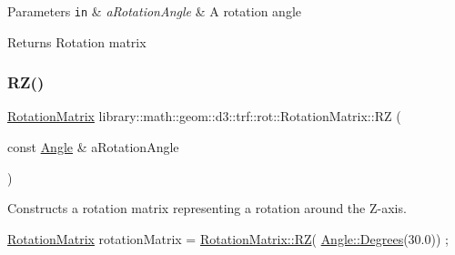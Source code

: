 \begin{DoxyParams}[1]{Parameters}
\mbox{\tt in}  & {\em a\+Rotation\+Angle} & A rotation angle \\
\hline
\end{DoxyParams}
\begin{DoxyReturn}{Returns}
Rotation matrix 
\end{DoxyReturn}
\mbox{\label{classlibrary_1_1math_1_1geom_1_1d3_1_1trf_1_1rot_1_1_rotation_matrix_afc63f5b893d8c0024a0ba5c2ed69ab1b}} 
\subsubsection{\texorpdfstring{R\+Z()}{RZ()}}
{\footnotesize\ttfamily \hyperlink{classlibrary_1_1math_1_1geom_1_1d3_1_1trf_1_1rot_1_1_rotation_matrix}{Rotation\+Matrix} library\+::math\+::geom\+::d3\+::trf\+::rot\+::\+Rotation\+Matrix\+::\+RZ (\begin{DoxyParamCaption}\item[{const \hyperlink{classlibrary_1_1math_1_1geom_1_1_angle}{Angle} \&}]{a\+Rotation\+Angle }\end{DoxyParamCaption})\hspace{0.3cm}{\ttfamily [static]}}



Constructs a rotation matrix representing a rotation around the Z-\/axis. 


\begin{DoxyCode}
\hyperlink{classlibrary_1_1math_1_1geom_1_1d3_1_1trf_1_1rot_1_1_rotation_matrix_a7f1184694020cb4f963d58931324ab06}{RotationMatrix} rotationMatrix = \hyperlink{classlibrary_1_1math_1_1geom_1_1d3_1_1trf_1_1rot_1_1_rotation_matrix_afc63f5b893d8c0024a0ba5c2ed69ab1b}{RotationMatrix::RZ}(
      \hyperlink{classlibrary_1_1math_1_1geom_1_1_angle_a64aa53e8420aeb6f671d86c65c370bc8}{Angle::Degrees}(30.0)) ;
\end{DoxyCode}



